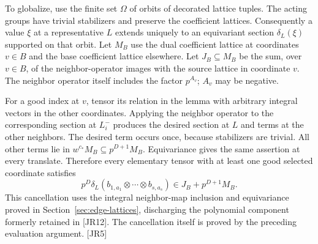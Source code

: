 \documentclass[11pt,a4paper]{article}
\numberwithin{equation}{section}
\theoremstyle{remark}\newtheorem{remark}[theorem]{Remark}
\begin{document}
To globalize, use the finite set $\Omega$ of orbits of decorated lattice tuples. The acting groups have trivial stabilizers and preserve the coefficient lattices. Consequently a value $\xi$ at a representative $L$ extends uniquely to an equivariant section $\delta_L(\xi)$ supported on that orbit. Let $M_B$ use the dual coefficient lattice at coordinates $v\in B$ and the base coefficient lattice elsewhere. Let $J_B\subseteq M_B$ be the sum, over $v\in B$, of the neighbor-operator images with the source lattice in coordinate $v$. The neighbor operator itself includes the factor $p^{A_v}$; $A_v$ may be negative.

For a good index at $v$, tensor its relation in the lemma with arbitrary integral vectors in the other coordinates. Applying the neighbor operator to the corresponding section at $L_i^-$ produces the desired section at $L$ and terms at the other neighbors. The desired term occurs once, because stabilizers are trivial. All other terms lie in $w^{c_*}M_B\subseteq p^{D+1}M_B$. Equivariance gives the same assertion at every translate. Therefore every elementary tensor with at least one good selected coordinate satisfies
\begin{equation}\label{eq:jr-one-good}
 p^D\delta_L(b_{1,a_1}\otimes\cdots\otimes b_{s,a_s})
       \in J_B+p^{D+1}M_B.
\end{equation}
This cancellation uses the integral neighbor-map inclusion and equivariance proved in Section~\ref{sec:edge-lattices}, discharging the polynomial component formerly retained in \textsf{[JR12]}. The cancellation itself is proved by the preceding evaluation argument. \textsf{[JR5]}
\end{document}

